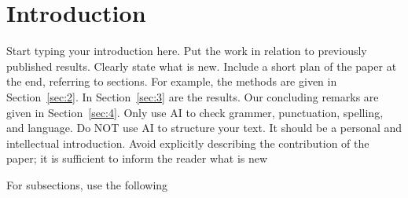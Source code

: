 \documentclass[a4paper,fleqn]{cas-sc} %
\begin{document}
\renewcommand{\figurename}{Fig.}

\theoremstyle{plain}%
\newtheorem{theorem}{Theorem}
\newtheorem{exa}{Example}
\newtheorem{rem}{Remark}
\newtheorem{proposition}{Proposition}
\newtheorem{lemma}{Lemma}
\newtheorem{corollary}{Corollary}

\theoremstyle{definition}
\newtheorem{definition}{Definition}
\newtheorem{remark}{Remark}
\newtheorem{example}{Example}
\newtheorem{assumption}{Assumption}


\newenvironment{Proof}{\paragraph{\textbf{\upshape Proof:}}}{\hfill$\square$}
\newenvironment{Proofx}[1]{\paragraph{\textbf{\upshape Proof of Theorem \ref{#1}:}}}{\hfill$\square$}

\def\E{\mbox{${\rm E}$}}
\def\D{\mbox{${\rm D}$}}



\begin{abstract}
The abstract should be short, informative, and avoid external references as much as possible. Follows a list of a few keywords in alphabetical order, and then Classification Codes, available for free from MathSciNet; see \url{mathscinet.ams.org/mathscinet/freeTools.html?version=2}.
\end{abstract}

\section{Introduction\label{sec:1}}

Start typing your introduction here. Put the work in relation to previously published results. Clearly state what is new. Include a short plan of the paper at the end, referring to sections. For example, the methods are given in Section~\ref{sec:2}. In Section~\ref{sec:3} are the results. Our concluding remarks are given in Section~\ref{sec:4}. Only use AI to check grammer, punctuation, spelling, and language. Do NOT use AI to structure your text. It should be a personal and intellectual introduction. Avoid explicitly describing the contribution of the paper; it is sufficient to inform the reader what is new

\medskip
For subsections, use the following
\end{document}
